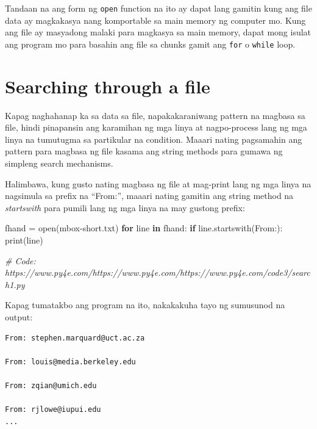 \documentclass[10pt,]{book}
\newenvironment{Shaded}{}{}
\newcommand{\BuiltInTok}[1]{\textcolor[rgb]{0.00,0.50,0.00}{#1}}
\newcommand{\CommentTok}[1]{\textcolor[rgb]{0.38,0.63,0.69}{\textit{#1}}}
\newcommand{\ControlFlowTok}[1]{\textcolor[rgb]{0.00,0.44,0.13}{\textbf{#1}}}
\newcommand{\KeywordTok}[1]{\textcolor[rgb]{0.00,0.44,0.13}{\textbf{#1}}}
\newcommand{\NormalTok}[1]{#1}
\newcommand{\OperatorTok}[1]{\textcolor[rgb]{0.40,0.40,0.40}{#1}}
\newcommand{\StringTok}[1]{\textcolor[rgb]{0.25,0.44,0.63}{#1}}
\begin{document}
Tandaan na ang form ng \texttt{open} function na ito ay dapat lang
gamitin kung ang file data ay magkakasya nang komportable sa main memory
ng computer mo. Kung ang file ay masyadong malaki para magkasya sa main
memory, dapat mong isulat ang program mo para basahin ang file sa chunks
gamit ang \texttt{for} o \texttt{while} loop.

\section{Searching through a file}\label{searching-through-a-file}

Kapag naghahanap ka sa data sa file, napakakaraniwang pattern na magbasa
sa file, hindi pinapansin ang karamihan ng mga linya at nagpo-process
lang ng mga linya na tumutugma sa partikular na condition. Maaari nating
pagsamahin ang pattern para magbasa ng file kasama ang string methods
para gumawa ng simpleng search mechanisms.

 

Halimbawa, kung gusto nating magbasa ng file at mag-print lang ng mga
linya na nagsimula sa prefix na ``From:'', maaari nating gamitin ang
string method na \emph{startswith} para pumili lang ng mga linya na may
gustong prefix:

\begin{Shaded}
\begin{Highlighting}[]
\NormalTok{fhand }\OperatorTok{=} \BuiltInTok{open}\NormalTok{(}\StringTok{\textquotesingle{}mbox{-}short.txt\textquotesingle{}}\NormalTok{)}
\ControlFlowTok{for}\NormalTok{ line }\KeywordTok{in}\NormalTok{ fhand:}
    \ControlFlowTok{if}\NormalTok{ line.startswith(}\StringTok{\textquotesingle{}From:\textquotesingle{}}\NormalTok{):}
        \BuiltInTok{print}\NormalTok{(line)}

\CommentTok{\# Code: https://www.py4e.com/https://www.py4e.com/https://www.py4e.com/code3/search1.py}
\end{Highlighting}
\end{Shaded}


Kapag tumatakbo ang program na ito, nakakakuha tayo ng sumusunod na
output:

{\small
\begin{verbatim}
From: stephen.marquard@uct.ac.za

From: louis@media.berkeley.edu

From: zqian@umich.edu

From: rjlowe@iupui.edu
...
\end{verbatim}
}
\end{document}
